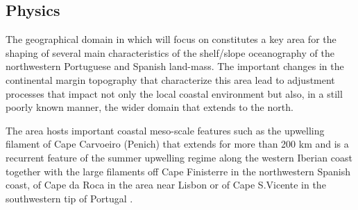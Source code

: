 \subsection{Physics}


The geographical domain in which \proj will focus on constitutes a key
area for the shaping of several main characteristics of the
shelf/slope oceanography of the northwestern Portuguese and Spanish
land-mass.  The important changes in the continental margin topography
that characterize this area lead to adjustment processes that impact
not only the local coastal environment but also, in a still poorly
known manner, the wider domain that extends to the north.


The area hosts important coastal meso-scale features such as the
upwelling filament of Cape Carvoeiro (Penich) that extends for more
than 200 km and is a recurrent feature of the summer upwelling regime
along the western Iberian coast together with the large filaments off
Cape Finisterre in the northwestern Spanish coast, of Cape da Roca in
the area near Lisbon or of Cape S.Vicente in the southwestern tip of
Portugal \cite{haynes93}.

